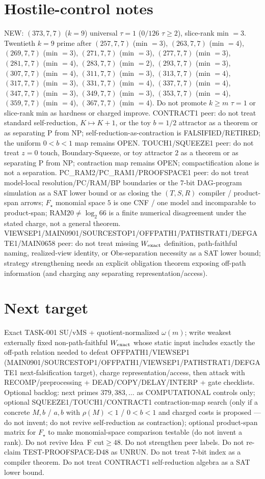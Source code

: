 \documentclass[11pt]{article}
\begin{document}
\section*{Hostile-control notes}
NEW: $(373,7,7)$ ($k{=}9$) universal $\tau{=}1$ ($0/126$ $\tau{\ge}2$), slice-rank min $=3$.
Twentieth $k{=}9$ prime after $(257,7,7)$ (min $=3$), $(263,7,7)$ (min $=4$), $(269,7,7)$ (min $=3$), $(271,7,7)$ (min $=3$), $(277,7,7)$ (min $=3$), $(281,7,7)$ (min $=4$), $(283,7,7)$ (min $=2$), $(293,7,7)$ (min $=3$), $(307,7,7)$ (min $=4$), $(311,7,7)$ (min $=3$), $(313,7,7)$ (min $=4$), $(317,7,7)$ (min $=3$), $(331,7,7)$ (min $=4$), $(337,7,7)$ (min $=4$), $(347,7,7)$ (min $=3$), $(349,7,7)$ (min $=3$), $(353,7,7)$ (min $=4$), $(359,7,7)$ (min $=4$), $(367,7,7)$ (min $=4$).
Do not promote $k{\ge}m$ $\tau{=}1$ or slice-rank min as hardness or charged improve.
CONTRACT1 peer: do not treat standard self-reduction, $K\mapsto K+1$, or the toy $b{=}1/2$ attractor as a theorem or as separating P from NP;
self-reduction-as-contraction is FALSIFIED/RETIRED; the uniform $0{<}b{<}1$ map remains OPEN.
TOUCH1/SQUEEZE1 peer: do not treat $z{=}0$ touch, Boundary-Squeeze, or toy attractor $2$ as a theorem or as separating P from NP;
contraction map remains OPEN; compactification alone is not a separation.
PC\_RAM2/PC\_RAM1/PROOFSPACE1 peer: do not treat model-local resolution/PC/RAM/BP boundaries or the $7$-bit DAG-program simulation as a SAT lower bound
or as closing the $(T,S,R)$ compiler / product-span arrows; $F_\star$ monomial space $5$ is one CNF / one model and incomparable to product-span;
RAM$20\neq\log_2 66$ is a finite numerical disagreement under the stated charge, not a general theorem.
VIEWSEP1/MAIN0901/SOURCESTOP1/OFFPATH1/PATHSTRAT1/DEFGATE1/MAIN0658 peer: do not treat missing $W_{\rm exact}$ definition,
path-faithful naming, realized-view identity, or Obs-separation necessity as a SAT lower bound;
strategy strengthening needs an explicit obligation theorem exposing off-path information
(and charging any separating representation/access).

\section*{Next target}
Exact TASK-001 SU/vMS + quotient-normalized $\omega(m)$; write weakest externally fixed non-path-faithful
$W_{\rm exact}$ whose static input includes exactly the off-path relation needed to defeat OFFPATH1/VIEWSEP1
(MAIN0901/SOURCESTOP1/OFFPATH1/VIEWSEP1/PATHSTRAT1/DEFGATE1 next-falsification target), charge representation/access,
then attack with RECOMP/preprocessing + DEAD/COPY/DELAY/INTERP + gate checklists.
Optional backlog: next primes $379,383,\ldots$ as COMPUTATIONAL controls only;
optional SQUEEZE1/TOUCH1/CONTRACT1 contraction-map search (only if a concrete $M,b$ / $a,b$ with $\rho(M){<}1$ / $0{<}b{<}1$ and charged costs is proposed --- do not invent; do not revive self-reduction as contraction);
optional product-span matrix for $F_\star$ to make monomial-space comparison testable (do not invent a rank).
Do not revive Idea~F cut$\ge48$. Do not strengthen peer labels.
Do not re-claim TEST-PROOFSPACE-D48 as UNRUN.
Do not treat $7$-bit index as a compiler theorem.
Do not treat CONTRACT1 self-reduction algebra as a SAT lower bound.
\end{document}
